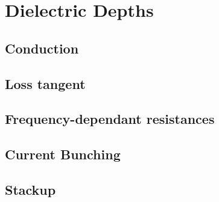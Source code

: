 

\section{Dielectric Depths}
\subsection{Conduction}
\subsection{Loss tangent}
\subsection{Frequency-dependant resistances}
\subsection{Current Bunching}
\subsection{Stackup}
